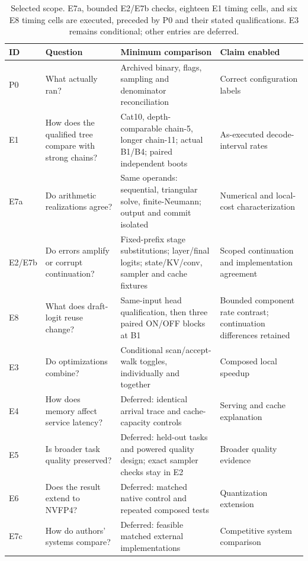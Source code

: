 \documentclass[conference]{IEEEtran}
\begin{document}
\begin{table}[t]
\caption{Selected scope. E7a, bounded E2/E7b checks, eighteen E1 timing cells, and six E8 timing cells are executed, preceded by P0 and their stated qualifications. E3 remains conditional; other entries are deferred.}
\label{tab:planned}
\centering\footnotesize
\begin{tabularx}{\textwidth}{@{}p{}p{}Y>{\raggedright\arraybackslash}p{0.20\textwidth}@{}}
\toprule
ID & Question & Minimum comparison & Claim enabled \\
\midrule
P0 & What actually ran? & Archived binary, flags, sampling and denominator reconciliation & Correct configuration labels \\
E1 & How does the qualified tree compare with strong chains? & Cat10, depth-comparable chain-5, longer chain-11; actual B1/B4; paired independent boots & As-executed decode-interval rates \\
E7a & Do arithmetic realizations agree? & Same operands: sequential, triangular solve, finite-Neumann; output and commit isolated & Numerical and local-cost characterization \\
E2/E7b & Do errors amplify or corrupt continuation? & Fixed-prefix stage substitutions; layer/final logits; state/KV/conv, sampler and cache fixtures & Scoped continuation and implementation agreement \\
E8 & What does draft-logit reuse change? & Same-input head qualification, then three paired ON/OFF blocks at B1 & Bounded component rate contrast; continuation differences retained \\
E3 & Do optimizations combine? & Conditional scan/accept-walk toggles, individually and together & Composed local speedup \\
E4 & How does memory affect service latency? & Deferred: identical arrival trace and cache-capacity controls & Serving and cache explanation \\
E5 & Is broader task quality preserved? & Deferred: held-out tasks and powered quality design; exact sampler checks stay in E2 & Broader quality evidence \\
E6 & Does the result extend to NVFP4? & Deferred: matched native control and repeated composed tests & Quantization extension \\
E7c & How do authors' systems compare? & Deferred: feasible matched external implementations & Competitive system comparison \\
\bottomrule
\end{tabularx}
\end{table}
\end{document}
